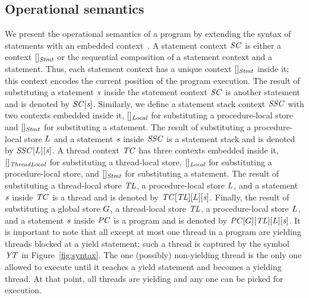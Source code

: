 \subsection{Operational semantics}
We present the operational semantics of a \civl program by extending the syntax of statements with an embedded context~\cite{WrightF94}.
A statement context $\mathit{SC}$ is either a context $[]_{\mathit{Stmt}}$ or the sequential composition of a 
statement context and a statement.
Thus, each statement context has a unique context $[]_{\mathit{Stmt}}$ inside it;
this context encodes the current position of the program execution.
The result of substituting a statement $\mathit{s}$ inside the statement context $\mathit{SC}$ is another statement and is denoted by $\mathit{SC}[\mathit{s}]$.
Similarly, we define a statement stack context $\mathit{SSC}$ with two contexts embedded inside it, $[]_{\mathit{Local}}$ for substituting a procedure-local store
and $[]_{\mathit{Stmt}}$ for substituting a statement.
The result of substituting a procedure-local store $L$ and a statement $\mathit{s}$ inside $\mathit{SSC}$ is a statement stack and is denoted by $\mathit{SSC}[L][\mathit{s}]$.
A thread context $\mathit{TC}$ has three contexts embedded inside it, $[]_{\mathit{ThreadLocal}}$ for substituting a thread-local store, 
$[]_{\mathit{Local}}$ for substituting a procedure-local store, and $[]_{\mathit{Stmt}}$ for substituting a statement.
The result of substituting a thread-local store $\mathit{TL}$, a procedure-local store $L$, and a statement $\mathit{s}$ inside $\mathit{TC}$ 
is a thread and is denoted by $\mathit{TC}[\mathit{TL}][L][\mathit{s}]$.
Finally, the result of substituting a global store $G$, a thread-local store $\mathit{TL}$, a procedure-local store $L$, and a statement $\mathit{s}$ inside $\mathit{PC}$ 
is a program and is denoted by $\mathit{PC}[G][\mathit{TL}][L][\mathit{s}]$.
It is important to note that all except at most one thread in a program are yielding threads blocked at a yield statement;
such a thread is captured by the symbol $\mathit{YT}$ in Figure~\ref{fig:syntax}.
The one (possibly) non-yielding thread is the only one allowed to execute until it reaches a yield statement and becomes a yielding thread.
At that point, all threads are yielding and any one can be picked for execution.

